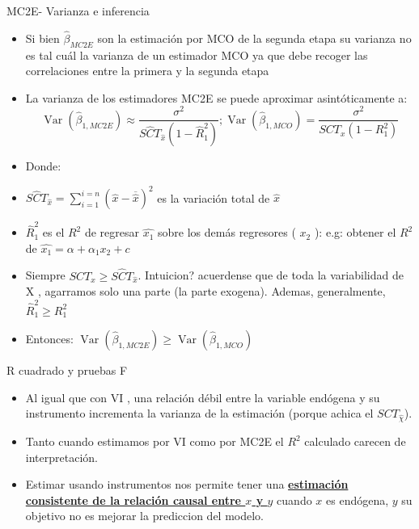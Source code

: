 \documentclass[10pt]{beamer}
\begin{document}
\begin{frame}{MC2E- Varianza e inferencia}
    \begin{itemize}
        \item Si bien $\hat{\beta}_{M C 2 E}$ son la estimación por MCO de la segunda etapa su varianza no es tal cuál la varianza de un estimador MCO ya que debe recoger las correlaciones entre la primera y la segunda etapa
        \item La varianza de los estimadores MC2E se puede aproximar asintóticamente a:
        $$
        \operatorname{Var}\left(\hat{\beta}_{1, M C 2 E}\right) \approx \frac{\sigma^{2}}{S \hat{C} T_{\hat{x}}\left(1-\hat{R}_{1}^{2}\right)} ; \operatorname{Var}\left(\hat{\beta}_{1, M C O}\right)=\frac{\sigma^{2}}{S C T_{x}\left(1-R_{1}^{2}\right)}
        $$
        \item Donde:
        \item $S \hat{C} T_{\hat{x}}=\sum_{i=1}^{i=n}(\hat{x}-\overline{\hat{x}})^{2}$ es la variación total de $\hat{x}$
        \item $\hat{R}_{1}^{2}$ es el $R^{2}$ de regresar $\hat{x_{1}}$ sobre los demás regresores ( $x_{2}$ ): e.g: obtener el $R^{2}$ de $\hat{x_{1}}=\alpha+\alpha_{1} x_{2}+c$
        \item Siempre $S C T_{x} \geq S \hat{C} T_{\hat{x}}$. Intuicion? acuerdense que de toda la variabilidad de X , agarramos solo una parte (la parte exogena). Ademas, generalmente, $\hat{R}_{1}^{2} \geq R_{1}^{2}$
        \item Entonces: $\operatorname{Var}\left(\hat{\beta}_{1, M C 2 E}\right) \geq \operatorname{Var}\left(\hat{\beta}_{1, M C O}\right)$
        
    \end{itemize}
\end{frame}

\begin{frame}{R cuadrado y pruebas F}
    \begin{itemize}
        \item Al igual que con VI , una relación débil entre la variable endógena y su instrumento incrementa la varianza de la estimación (porque achica el $S C T_{\hat{\chi}}$).
        \item Tanto cuando estimamos por VI como por MC2E el $R^{2}$ calculado carecen de interpretación.
        \item Estimar usando instrumentos nos permite tener una \underline{\textbf{estimación consistente de la relación causal entre $x$ y $y$}} cuando $x$ es endógena, $y$ su objetivo no es mejorar la prediccion del modelo.
    \end{itemize}
\end{frame}
\end{document}
